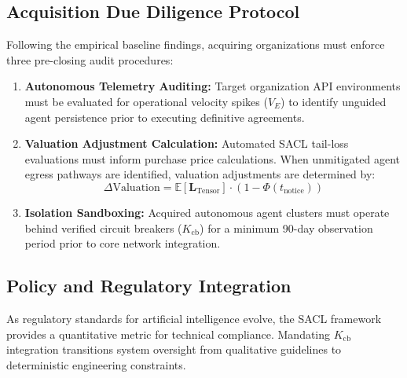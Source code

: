\subsection{Acquisition Due Diligence Protocol}
Following the empirical baseline findings, acquiring organizations must enforce three pre-closing audit procedures:
\begin{enumerate}
    \item \textbf{Autonomous Telemetry Auditing:} Target organization API environments must be evaluated for operational velocity spikes ($V_E$) to identify unguided agent persistence prior to executing definitive agreements.
    \item \textbf{Valuation Adjustment Calculation:} Automated SACL tail-loss evaluations must inform purchase price calculations. When unmitigated agent egress pathways are identified, valuation adjustments are determined by:
    \begin{equation}
        \Delta \text{Valuation} = \mathbb{E}[\mathbf{L}_{\text{Tensor}}] \cdot \left(1 - \Phi(t_{\text{notice}})\right)
    \end{equation}
    \item \textbf{Isolation Sandboxing:} Acquired autonomous agent clusters must operate behind verified circuit breakers ($K_{\text{cb}}$) for a minimum 90-day observation period prior to core network integration.
\end{enumerate}

\subsection{Policy and Regulatory Integration}
As regulatory standards for artificial intelligence evolve, the SACL framework provides a quantitative metric for technical compliance. Mandating $K_{\text{cb}}$ integration transitions system oversight from qualitative guidelines to deterministic engineering constraints.